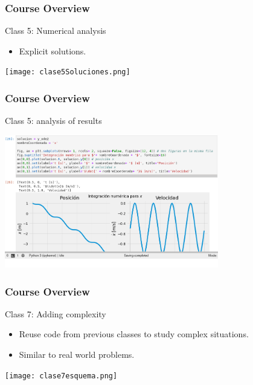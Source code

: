 \documentclass[aspectratio=169]{beamer}
\begin{document}
\begin{frame}
	\frametitle{Course Overview}
	Class 5: Numerical analysis
	\begin{block}{}
		\begin{itemize}
			\item Explicit solutions.
		\end{itemize}
	\texttt{[image: clase5Soluciones.png]}
	\end{block}
\end{frame}

\begin{frame}
	\frametitle{Course Overview}
	Class 5: analysis of results
	\begin{block}{}
	\includegraphics[width= 0.7\textwidth]{clase5Representación}
	\end{block}
\end{frame}

\begin{frame}
	\frametitle{Course Overview}
	Class 7: Adding complexity
	\begin{block}{}
		\begin{itemize}
			\item Reuse code from previous classes to study complex situations.
			\item Similar to real world problems.
		\end{itemize}
	\texttt{[image: clase7esquema.png]}
	\end{block}
\end{frame}
\end{document}
